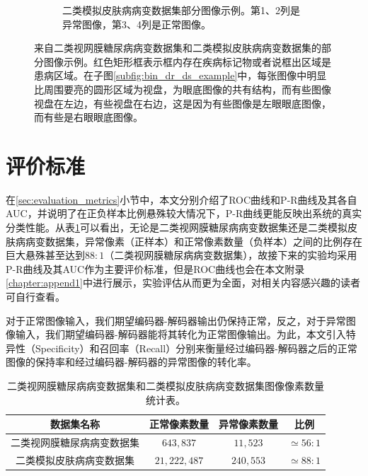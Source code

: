 \begin{figure}[h]
\begin{subfigure}{0.48\textwidth}
		\caption{二类模拟皮肤病病变数据集部分图像示例。第1、2列是异常图像，第3、4列是正常图像。}
		\label{subfig:bin_simulate_skin_example}
	\end{subfigure}
	\caption{来自二类视网膜糖尿病病变数据集和二类模拟皮肤病病变数据集的部分图像示例。红色矩形框表示框内存在疾病标记物或者说框出区域是患病区域。在子图\ref{subfig:bin_dr_ds_example}中，每张图像中明显比周围要亮的圆形区域为视盘，为眼底图像的共有结构，而有些图像视盘在左边，有些视盘在右边，这是因为有些图像是左眼眼底图像，而有些是右眼眼底图像。}
	\label{mul_fig:bin_ds_example}
\end{figure}
\section{评价标准}\label{sec:exper_evaluation_metrics}

在\ref{sec:evaluation_metrics}小节中，本文分别介绍了ROC曲线和P-R曲线及其各自AUC，并说明了在正负样本比例悬殊较大情况下，P-R曲线更能反映出系统的真实分类性能。从表\ref{tab:bin_ds_pixel_freqs}可以看出，无论是二类视网膜糖尿病病变数据集还是二类模拟皮肤病病变数据集，异常像素（正样本）和正常像素数量（负样本）之间的比例存在巨大悬殊甚至达到$88:1$（二类视网膜糖尿病病变数据集），故接下来的实验均采用P-R曲线及其AUC作为主要评价标准，但是ROC曲线也会在本文附录\ref{chapter:append1}中进行展示，实验评估从而更为全面，对相关内容感兴趣的读者可自行查看。

对于正常图像输入，我们期望编码器-解码器输出仍保持正常，反之，对于异常图像输入，我们期望编码器-解码器能将其转化为正常图像输出。为此，本文引入特异性（Specificity）和召回率（Recall）分别来衡量经过编码器-解码器之后的正常图像的保持率和经过编码器-解码器的异常图像的转化率。

\begin{table}[h]
	\centering
	\caption{二类视网膜糖尿病病变数据集和二类模拟皮肤病病变数据集图像像素数量统计表。}
	\label{tab:bin_ds_pixel_freqs}
	\begin{tabular}{c|c|c|c}
		\toprule[2pt]
		数据集名称 & 正常像素数量 & 异常像素数量 & 比例 \\
		\midrule[2pt]
		二类视网膜糖尿病病变数据集&  $643,837$ & $11,523$ & $\simeq 56: 1$ \\ \hline
		二类模拟皮肤病病变数据集 & $21,222,487$ & $240,553$ & $\simeq 88: 1$ \\
		\bottomrule[2pt]
	\end{tabular}
\end{table}


